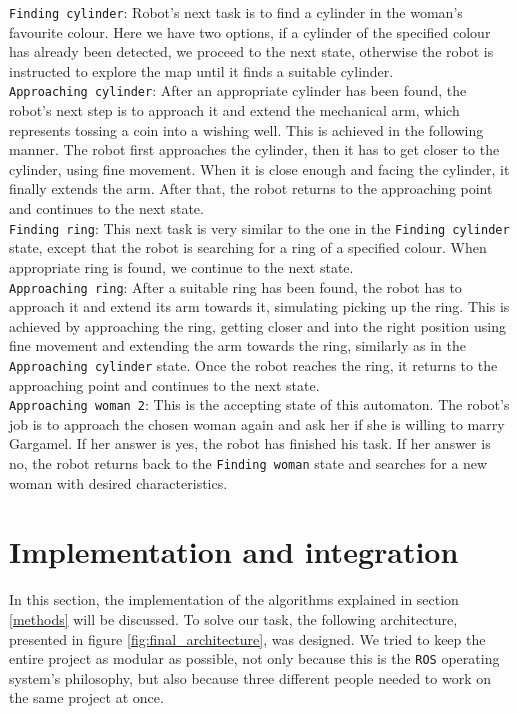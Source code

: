 \documentclass[12pt,a4paper]{article}
\begin{document}
	\texttt{Finding cylinder}: Robot's next task is to find a cylinder in the woman's favourite colour. Here we have two options, if a cylinder of the specified colour has already been detected, we proceed to the next state, otherwise the robot is instructed to explore the map until it finds a suitable cylinder. \\

	\texttt{Approaching cylinder}: After an appropriate cylinder has been found, the robot's next step is to approach it and extend the mechanical arm, which represents tossing a coin into a wishing well. This is achieved in the following manner. The robot first approaches the cylinder, then it has to get closer to the cylinder, using fine movement. When it is close enough and facing the cylinder, it finally extends the arm. After that, the robot returns to the approaching point and continues to the next state. \\

	\texttt{Finding ring}: This next task is very similar to the one in the \texttt{Finding cylinder} state, except that the robot is searching for a ring of a specified colour. When appropriate ring is found, we continue to the next state. \\

	\texttt{Approaching ring}: After a suitable ring has been found, the robot has to approach it and extend its arm towards it, simulating picking up the ring. This is achieved by approaching the ring, getting closer and into the right position using fine movement and extending the arm towards the ring, similarly as in the \texttt{Approaching cylinder} state. Once the robot reaches the ring, it returns to the approaching point and continues to the next state. \\

	\texttt{Approaching woman 2}: This is the accepting state of this automaton. The robot's job is to approach the chosen woman again and ask her if she is willing to marry Gargamel. If her answer is yes, the robot has finished his task. If her answer is no, the robot returns back to the \texttt{Finding woman} state and searches for a new woman with desired characteristics. \\
	
	\section{Implementation and integration}
	In this section, the implementation of the algorithms explained in section \ref{methods} will be discussed. To solve our task, the following architecture, presented in figure \ref{fig:final_architecture}, was designed. We tried to keep the entire project as modular as possible, not only because this is the \texttt{ROS} operating system's philosophy, but also because three different people needed to work on the same project at once. \\
	
\end{document}
